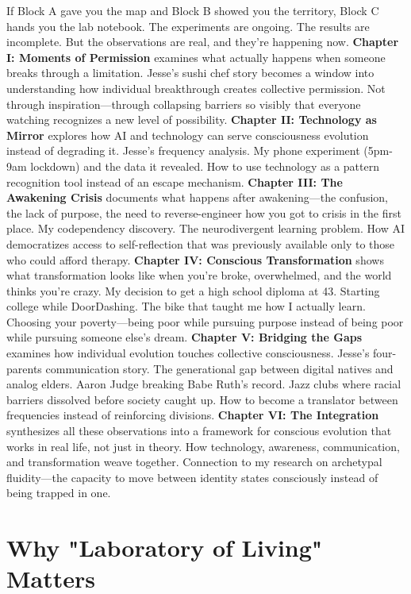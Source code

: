 If Block A gave you the map and Block B showed you the territory, Block C hands you the lab notebook.
The experiments are ongoing. The results are incomplete. But the observations are real, and they're happening now.
\textbf{Chapter I: Moments of Permission} examines what actually happens when someone breaks through a limitation. Jesse's sushi chef story becomes a window into understanding how individual breakthrough creates collective permission. Not through inspiration—through collapsing barriers so visibly that everyone watching recognizes a new level of possibility.
\textbf{Chapter II: Technology as Mirror} explores how AI and technology can serve consciousness evolution instead of degrading it. Jesse's frequency analysis. My phone experiment (5pm-9am lockdown) and the data it revealed. How to use technology as a pattern recognition tool instead of an escape mechanism.
\textbf{Chapter III: The Awakening Crisis} documents what happens after awakening—the confusion, the lack of purpose, the need to reverse-engineer how you got to crisis in the first place. My codependency discovery. The neurodivergent learning problem. How AI democratizes access to self-reflection that was previously available only to those who could afford therapy.
\textbf{Chapter IV: Conscious Transformation} shows what transformation looks like when you're broke, overwhelmed, and the world thinks you're crazy. My decision to get a high school diploma at 43. Starting college while DoorDashing. The bike that taught me how I actually learn. Choosing your poverty—being poor while pursuing purpose instead of being poor while pursuing someone else's dream.
\textbf{Chapter V: Bridging the Gaps} examines how individual evolution touches collective consciousness. Jesse's four-parents communication story. The generational gap between digital natives and analog elders. Aaron Judge breaking Babe Ruth's record. Jazz clubs where racial barriers dissolved before society caught up. How to become a translator between frequencies instead of reinforcing divisions.
\textbf{Chapter VI: The Integration} synthesizes all these observations into a framework for conscious evolution that works in real life, not just in theory. How technology, awareness, communication, and transformation weave together. Connection to my research on archetypal fluidity—the capacity to move between identity states consciously instead of being trapped in one.

\section{Why "Laboratory of Living" Matters}

